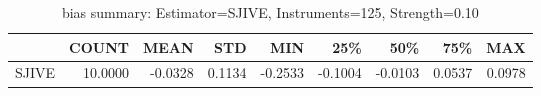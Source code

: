 \begin{table}[ht]
\centering
\caption{bias summary: Estimator=SJIVE, Instruments=125, Strength=0.10}
\begin{tabular}{lrrrrrrrr}
\toprule
 & COUNT & MEAN & STD & MIN & 25\% & 50\% & 75\% & MAX \\
\midrule
SJIVE & 10.0000 & -0.0328 & 0.1134 & -0.2533 & -0.1004 & -0.0103 & 0.0537 & 0.0978 \\
\bottomrule
\end{tabular}
\end{table}
